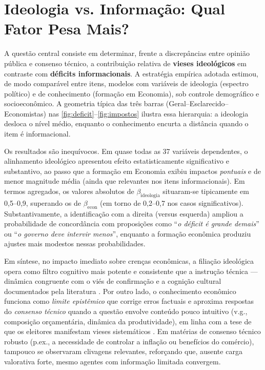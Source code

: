\section{Ideologia vs. Informação: Qual Fator Pesa Mais?}

A questão central consiste em determinar, frente a discrepâncias entre opinião pública e consenso técnico, a contribuição relativa de \textbf{vieses ideológicos} em contraste com \textbf{déficits informacionais}. A estratégia empírica adotada estimou, de modo comparável entre itens, modelos com variáveis de ideologia (espectro político) e de conhecimento (formação em Economia), sob controle demográfico e socioeconômico. A geometria típica das três barras (Geral–Esclarecido–Economistas) nas \autoref{fig:deficit}–\autoref{fig:impostos} ilustra essa hierarquia: a ideologia desloca o nível médio, enquanto o conhecimento encurta a distância quando o item é informacional.

Os resultados são inequívocos. Em quase todas as 37 variáveis dependentes, o alinhamento ideológico apresentou efeito estatisticamente significativo e substantivo, ao passo que a formação em Economia exibiu impactos \textit{pontuais} e de menor magnitude média (ainda que relevantes nos itens informacionais). Em termos agregados, os valores absolutos de $\beta_{\text{ideologia}}$ situaram-se tipicamente em 0{,}5--0{,}9, superando os de $\beta_{\text{econ}}$ (em torno de 0{,}2--0{,}7 nos casos significativos). Substantivamente, a identificação com a direita (versus esquerda) ampliou a probabilidade de concordância com proposições como ``\textit{o déficit é grande demais}'' ou ``\textit{o governo deve intervir menos}'', enquanto a formação econômica produziu ajustes mais modestos nessas probabilidades.

Em síntese, no impacto imediato sobre crenças econômicas, a filiação ideológica opera como filtro cognitivo mais potente e consistente que a instrução técnica --- dinâmica congruente com o viés de confirmação e a cognição cultural documentados pela literatura \cite{kahneman2011thinking, kahan2012polarization}. Por outro lado, o conhecimento econômico funciona como \textit{limite epistêmico} que corrige erros factuais e aproxima respostas do \textit{consenso técnico} quando a questão envolve conteúdo pouco intuitivo (v.g., composição orçamentária, dinâmica da produtividade), em linha com a tese de que os eleitores manifestam vieses sistemáticos \cite{The_Myth_of_the_Rational_Voter}. Em matérias de consenso técnico robusto (p.ex., a necessidade de controlar a inflação ou benefícios do comércio), tampouco se observaram clivagens relevantes, reforçando que, ausente carga valorativa forte, mesmo agentes com informação limitada convergem.

